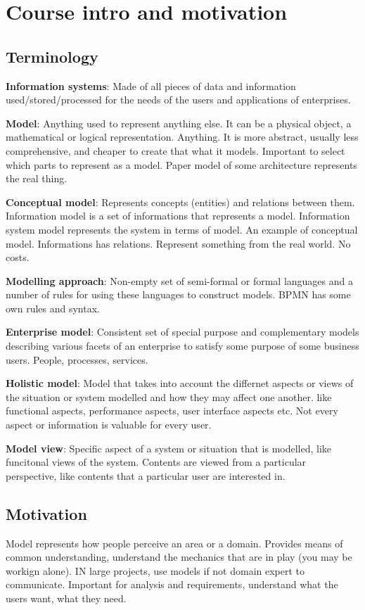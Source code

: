 \section{Course intro and motivation}
\subsection{Terminology}
\textbf{Information systems}: Made of all pieces of data and information used/stored/processed for the needs of the users and applications of enterprises.

\textbf{Model}: Anything used to represent anything else. It can be a physical object, a mathematical or logical representation. Anything. It is more abstract, usually less comprehensive, and cheaper to create that what it models. Important to select which parts to represent as a model. Paper model of some architecture represents the real thing.

\textbf{Conceptual model}: Represents concepts (entities) and relations between them. Information model is a set of informations that represents a model. Information system model represents the system in terms of model. An example of conceptual model. Informations has relations. Represent something from the real world. No costs.

\textbf{Modelling approach}: Non-empty set of semi-formal or formal languages and a number of rules for using these languages to construct models. BPMN has some own rules and syntax.

\textbf{Enterprise model}: Consistent set of special purpose and complementary models describing various facets of an enterprise to satisfy some purpose of some business users. People, processes, services. 

\textbf{Holistic model}: Model that takes into account the differnet aspects or views of the situation or system modelled and how they may affect one another. like functional aspects, performance aspects, user interface aspects etc. Not every aspect or information is valuable for every user.

\textbf{Model view}: Specific aspect of a system or situation that is modelled, like funcitonal views of the system. Contents are viewed from a particular perspective, like contents that a particular user are interested in.

\subsection{Motivation}
Model represents how people perceive an area or a domain. Provides means of common understanding, understand the mechanics that are in play (you may be workign alone). IN large projects, use models if not domain expert to communicate. Important for analysis and requirements, understand what the users want, what they need.


